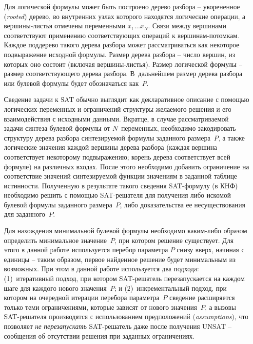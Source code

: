 Для логической формулы может быть построено дерево разбора \--- укорененное (\textit{rooted}) дерево, во внутренних узлах которого находятся логические операции, а вершины-листья отмечены переменными $x_{1} \ldots x_{N}$.
Связи между вершинами соответствуют применению соответствующих операций к вершинам-потомкам.
Каждое поддерево такого дерева разбора может рассматриваться как некоторое подвыражение исходной формулы.
Размер дерева разбора \--- число вершин, из которых оно состоит (включая вершины-листья).
Размер логической формулы \--- размер соответствующего дерева разбора.
В~дальнейшем размер дерева разбора или булевой формулы будет обозначаться как~$P$.

Сведение задачи к SAT обычно выглядит как декларативное описание с помощью логических переменных и ограничений структуры желаемого решения и его взаимодействия с исходными данными.
Вкратце, в случае рассматриваемой задачи синтеза булевой формулы от $N$~переменных, необходимо закодировать структуру дерева разбора синтезируемой формулы заданного размера~$P$, а также логические значения каждой вершины дерева разбора (каждая вершина соответствует некоторому подвыражению; корень дерева соответствует всей формуле) на различных входах.
После этого необходимо добавить ограничение на соответствие значений синтезируемой функции значениям в заданной таблице истинности.
Полученную в результате такого сведения SAT-формулу (в КНФ) необходимо решить с помощью SAT-решателя для получения либо искомой булевой формулы заданного размера~$P$, либо доказательства ее несуществования для заданного~$P$.

Для нахождения минимальной булевой формулы необходимо каким-либо образом определить минимальное значение~$P$, при котором решение существует.
Для этого в данной работе используется перебор параметра $P$ снизу вверх, начиная с единицы \--- таким образом, первое найденное решение будет минимальным из возможных.
При этом в данной работе используется два подхода: (1)~итеративный подход, при котором SAT-решатель перезапускается на каждом шаге для каждого нового значения~$P$; и (2)~инкрементальный подход, при котором на очередной итерации перебора параметра~$P$ сведение расширяется только теми ограничениями, которые зависят от нового значения~$P$, а вызовы SAT-решателя производятся с использованием предположений (\textit{assumptions}), что позволяет \emph{не перезапускать} SAT-решатель даже после получения UNSAT \--- сообщения об отсутствии решения при заданных ограничениях.

